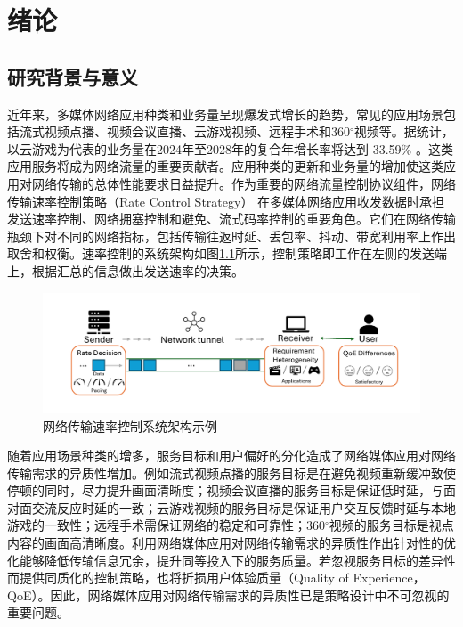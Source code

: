 
\chapter{绪论}

\section{研究背景与意义}
近年来，多媒体网络应用种类和业务量呈现爆发式增长的趋势，常见的应用场景包括流式视频点播、视频会议直播、云游戏视频、远程手术和360$^{\circ}$视频等。据统计，以云游戏为代表的业务量在2024年至2028年的复合年增长率将达到 33.59\% \cite{Global-Cloud-Gaming-Market-Size}。这类应用服务将成为网络流量的重要贡献者。应用种类的更新和业务量的增加使这类应用对网络传输的总体性能要求日益提升。作为重要的网络流量控制协议组件，网络传输速率控制策略（Rate Control Strategy） 在多媒体网络应用收发数据时承担发送速率控制、网络拥塞控制和避免、流式码率控制的重要角色。它们在网络传输瓶颈下对不同的网络指标，包括传输往返时延、丢包率、抖动、带宽利用率上作出取舍和权衡。速率控制的系统架构如图\ref{fig:teaser_system_archi}所示，控制策略即工作在左侧的发送端上，根据汇总的信息做出发送速率的决策。


\begin{figure} [ht]
\centering
\includegraphics[width=\textwidth]{figures/chap01/system_archi.pdf} 
\caption{网络传输速率控制系统架构示例}
\label{fig:teaser_system_archi}
\end{figure}


随着应用场景种类的增多，服务目标和用户偏好的分化造成了网络媒体应用对网络传输需求的异质性增加。例如流式视频点播的服务目标是在避免视频重新缓冲致使停顿的同时，尽力提升画面清晰度；视频会议直播的服务目标是保证低时延，与面对面交流反应时延的一致；云游戏视频的服务目标是保证用户交互反馈时延与本地游戏的一致性；远程手术需保证网络的稳定和可靠性；360$^{\circ}$视频的服务目标是视点内容的画面高清晰度。利用网络媒体应用对网络传输需求的异质性作出针对性的优化能够降低传输信息冗余，提升同等投入下的服务质量。若忽视服务目标的差异性而提供同质化的控制策略，也将折损用户体验质量（Quality of Experience，QoE）\cite{zhang2019e2e}。因此，网络媒体应用对网络传输需求的异质性已是策略设计中不可忽视的重要问题。

